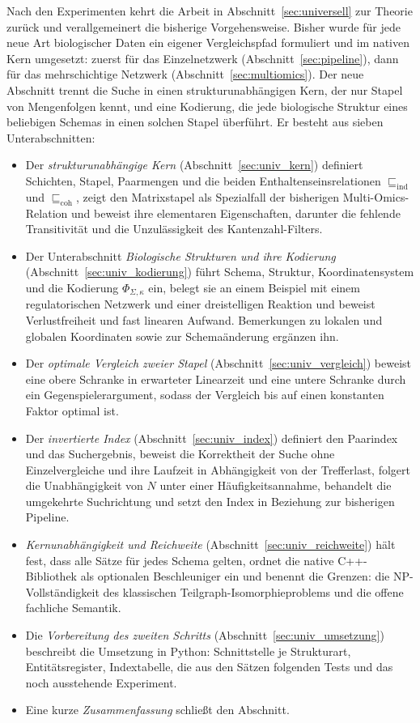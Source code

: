 \documentclass[a4paper,12pt, twoside]{report}
\theoremstyle{definition}
\begin{document}
Nach den Experimenten kehrt die Arbeit in Abschnitt~\ref{sec:universell} zur Theorie zurück und verallgemeinert die bisherige Vorgehensweise. Bisher wurde für jede neue Art biologischer Daten ein eigener Vergleichspfad formuliert und im nativen Kern umgesetzt: zuerst für das Einzelnetzwerk (Abschnitt~\ref{sec:pipeline}), dann für das mehrschichtige Netzwerk (Abschnitt~\ref{sec:multiomics}). Der neue Abschnitt trennt die Suche in einen strukturunabhängigen Kern, der nur Stapel von Mengenfolgen kennt, und eine Kodierung, die jede biologische Struktur eines beliebigen Schemas in einen solchen Stapel überführt. Er besteht aus sieben Unterabschnitten:
\begin{itemize}
	\item Der \emph{strukturunabhängige Kern} (Abschnitt~\ref{sec:univ_kern}) definiert Schichten, Stapel, Paarmengen und die beiden Enthaltenseinsrelationen $\sqsubseteq_{\mathrm{ind}}$ und $\sqsubseteq_{\mathrm{coh}}$, zeigt den Matrixstapel als Spezialfall der bisherigen Multi-Omics-Relation und beweist ihre elementaren Eigenschaften, darunter die fehlende Transitivität und die Unzulässigkeit des Kantenzahl-Filters.
	\item Der Unterabschnitt \emph{Biologische Strukturen und ihre Kodierung} (Abschnitt~\ref{sec:univ_kodierung}) führt Schema, Struktur, Koordinatensystem und die Kodierung $\Phi_{\Sigma,\kappa}$ ein, belegt sie an einem Beispiel mit einem regulatorischen Netzwerk und einer dreistelligen Reaktion und beweist Verlustfreiheit und fast linearen Aufwand. Bemerkungen zu lokalen und globalen Koordinaten sowie zur Schemaänderung ergänzen ihn.
	\item Der \emph{optimale Vergleich zweier Stapel} (Abschnitt~\ref{sec:univ_vergleich}) beweist eine obere Schranke in erwarteter Linearzeit und eine untere Schranke durch ein Gegenspielerargument, sodass der Vergleich bis auf einen konstanten Faktor optimal ist.
	\item Der \emph{invertierte Index} (Abschnitt~\ref{sec:univ_index}) definiert den Paarindex und das Suchergebnis, beweist die Korrektheit der Suche ohne Einzelvergleiche und ihre Laufzeit in Abhängigkeit von der Trefferlast, folgert die Unabhängigkeit von $N$ unter einer Häufigkeitsannahme, behandelt die umgekehrte Suchrichtung und setzt den Index in Beziehung zur bisherigen Pipeline.
	\item \emph{Kernunabhängigkeit und Reichweite} (Abschnitt~\ref{sec:univ_reichweite}) hält fest, dass alle Sätze für jedes Schema gelten, ordnet die native C++-Bibliothek als optionalen Beschleuniger ein und benennt die Grenzen: die NP-Vollständigkeit des klassischen Teilgraph-Isomorphieproblems und die offene fachliche Semantik.
	\item Die \emph{Vorbereitung des zweiten Schritts} (Abschnitt~\ref{sec:univ_umsetzung}) beschreibt die Umsetzung in Python: Schnittstelle je Strukturart, Entitätsregister, Indextabelle, die aus den Sätzen folgenden Tests und das noch ausstehende Experiment.
	\item Eine kurze \emph{Zusammenfassung} schließt den Abschnitt.
\end{itemize}
\end{document}
